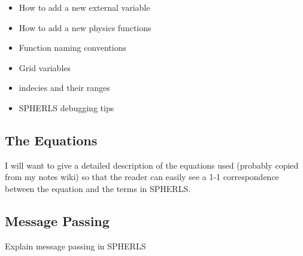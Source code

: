 \documentclass[12pt,a4paper]{book}
\begin{document}
\begin{itemize}
\begin{enumerate}
\end{enumerate}
\item How to add a new external variable
\item How to add a new physics functions
\item Function naming conventions
\item Grid variables
\item indecies and their ranges
\item SPHERLS debugging tips
\end{itemize}

\subsection{The Equations}
I will want to give a detailed description of the equations used (probably copied from my notes wiki) so that the reader can easily see a 1-1 correspondence between the equation and the terms in SPHERLS.

\subsection{Message Passing}
Explain message passing in SPHERLS
\end{document}

